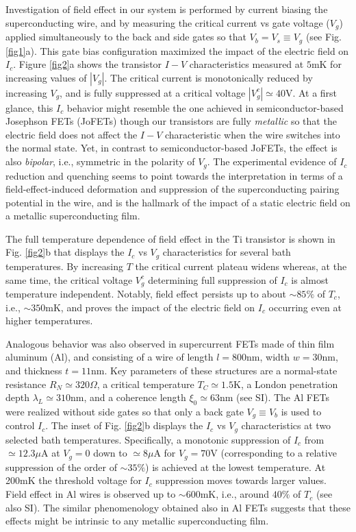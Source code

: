 \documentclass[prl,twocolumn,reprint,graphicx,showpacs,superscriptaddress,floatfix]{revtex4-1}
\begin{document}
Investigation of field effect in our system is performed by current biasing the superconducting wire, and by measuring the  critical current vs gate voltage  ($V_{g}$) applied simultaneously to the back and side gates so that $V_b=V_s\equiv V_{g}$ (see Fig. \ref{fig1}a). 
This gate bias configuration maximized the impact of the electric field on $I_c$. 
Figure \ref{fig2}a shows the transistor $I-V$ characteristics measured at $5$mK for increasing values of $|V_{g}|$. 
The critical current is monotonically reduced by increasing $V_{g}$, and is fully suppressed at a critical voltage $|V_{g}^c|\simeq 40$V. 
At a first glance, this $I_c$ behavior might resemble  the one achieved in semiconductor-based Josephson FETs (JoFETs) \cite{Marcus1,Marcus2,Takayanagi1985,Kleinsasser1989,Doh2005,Xiang2006} though our transistors are fully \emph{metallic} so that the electric field does not affect the $I-V$ characteristic when the wire switches into the normal state.
Yet, in contrast to semiconductor-based JoFETs, the  effect is also \emph{bipolar}, i.e., symmetric in  the polarity of $V_{g}$. 
The experimental evidence of $I_c$ reduction and quenching seems to point towards the interpretation in terms of a field-effect-induced deformation and suppression of the superconducting pairing potential in the wire, and is the hallmark of the impact of a static electric field on a metallic superconducting  film.

The full temperature dependence of field effect in the Ti transistor is shown in Fig. \ref{fig2}b that displays the $I_c$ vs $V_{g}$ characteristics for several bath temperatures. 
By increasing $T$ the critical current plateau widens whereas,  at the same time, the critical voltage $V_g^c$ determining full suppression of  $I_c$ is almost temperature independent. 
Notably, field effect persists up to about $\sim 85\%$ of $T_c$, i.e., $\sim 350$mK, 
and proves the impact of the electric field on $I_c$ occurring even at higher temperatures.

Analogous behavior was also observed in supercurrent  FETs made of thin film aluminum (Al), and consisting of a wire of length $l=800$nm, width $w=30$nm, and thickness $t=11$nm. 
Key parameters of these structures are a normal-state resistance $R_N\simeq 320\Omega$, a critical temperature $T_C\simeq 1.5$K,
a London penetration depth $\lambda_L\simeq 310$nm, and a coherence length $\xi_0\simeq 63$nm (see SI). 
The Al FETs were realized  without side gates so that only a back gate $V_g\equiv V_b$ is used to control $I_c$.
The inset of Fig. \ref{fig2}b displays the $I_c$ vs $V_g$  characteristics at two selected bath temperatures.  Specifically, a monotonic suppression of $I_c$ from $\simeq 12.3\mu$A at $V_g=0$ down to $\simeq 8\mu$A for $V_g=70$V (corresponding to a relative suppression of the order of $\sim 35\%$) is achieved at the lowest temperature. At 200mK the threshold voltage for $I_c$ suppression moves towards larger values. 
Field effect in Al wires is observed up to $\sim 600$mK, i.e., around $40\%$ of $T_c$ (see also SI). 
The similar phenomenology obtained also in Al  FETs suggests that these effects might be intrinsic to any metallic superconducting film.  
\end{document}

